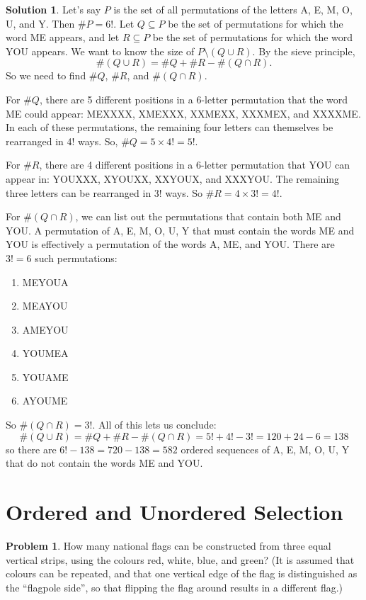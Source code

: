 \documentclass[12pt,a4paper]{article}
\numberwithin{equation}{section}
\theoremstyle{plain}
\theoremstyle{definition}
\newtheorem{problem}{Problem}
\theoremstyle{solutionstyle}
\newtheorem*{solution*}{Solution} %
\theoremstyle{definition} %
\begin{document}
	\begin{solution*}
		Let's say $P$ is the set of all permutations of the letters A, E, M, O, U, and Y. Then $\#P = 6!$. Let $Q \subseteq P$ be the set of permutations for which the word ME appears, and let $R \subseteq P$ be the set of permutations for which the word YOU appears. We want to know the size of $P \setminus(Q \cup R)$. By the sieve principle, $$\#(Q \cup R) = \#Q + \#R - \#(Q \cap R).$$ So we need to find $\#Q$, $\#R$, and $\#(Q \cap R)$. 
		
		For $\#Q$, there are 5 different positions in a 6-letter permutation that the word ME could appear: MEXXXX, XMEXXX, XXMEXX, XXXMEX, and XXXXME. In each of these permutations, the remaining four letters can themselves be rearranged in 4! ways. So, $\#Q = 5 \times 4! = 5!$. 
		
		For $\#R$, there are 4 different positions in a 6-letter permutation that YOU can appear in: YOUXXX, XYOUXX, XXYOUX, and XXXYOU. The remaining three letters can be rearranged in 3! ways. So $\#R = 4 \times 3! = 4!$. 
		
		For $\#(Q \cap R)$, we can list out the permutations that contain both ME and YOU. A permutation of A, E, M, O, U, Y that must contain the words ME and YOU is effectively a permutation of the words A, ME, and YOU. There are $3! = 6$ such permutations: 
		\begin{enumerate}
			\item MEYOUA
			\item MEAYOU
			\item AMEYOU
			\item YOUMEA
			\item YOUAME
			\item AYOUME
		\end{enumerate}
		So $\#(Q \cap R) = 3!$. All of this lets us conclude: 
		\[
		\#(Q \cup R) = \#Q + \#R - \#(Q \cap R) = 5! + 4! - 3! = 120 + 24 - 6 = 138
		\]
		so there are $6! - 138 = 720 - 138 = \boxed{582}$ ordered sequences of A, E, M, O, U, Y that do not contain the words ME and YOU. 
	\end{solution*}
	
	\section*{Ordered and Unordered Selection}
	
	\begin{problem}
		How many national flags can be constructed from three equal vertical strips, using the colours red, white, blue, and green? (It is assumed that colours can be repeated, and that one vertical edge of the flag is distinguished as the ``flagpole side'', so that flipping the flag around results in a different flag.)
	\end{problem}
	
\end{document}
